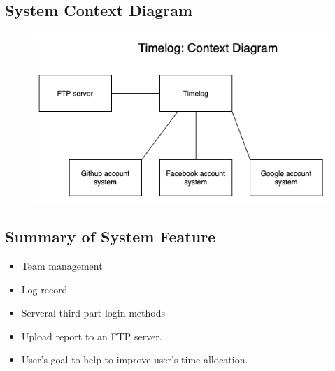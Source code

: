 \documentclass[12pt, a4paper]{article}
\begin{document}
\begin{CJK*}{UTF8}{bkai}
  \subsection{System Context Diagram}
    \begin{figure}[!htbp]
      \centering
      \includegraphics[width=\linewidth]{img/Context_Diagram.png}
    \end{figure}

  \subsection{Summary of System Feature}
    \begin{itemize}
      \item Team management
      \item Log record
      \item Serveral third part login methods
      \item Upload report to an FTP server.
      \item User's goal to help to improve user's time allocation.
    \end{itemize}

  \newpage


\end{CJK*}
\end{document}
